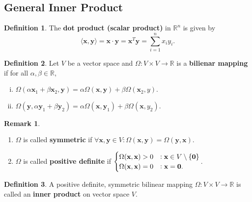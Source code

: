 \documentclass[12pt,openany]{book}
\theoremstyle{definition}
\newtheorem{definition}{Definition}[chapter]
\newtheorem{remark}{Remark}[chapter]
\newcommand{\R}{\mathbb{R}}
\begin{document}
	\subsection{General Inner Product}
	\begin{tcolorbox}[colframe=defcolor,title={\color{white}\bf Dot Product (Scalar Product)}]
		\begin{definition}
			The \textbf{dot product (scalar product)} in \(\R^n\) is given by \[
			\langle\textbf{x},\textbf{y}\rangle=\textbf{x}\cdot\textbf{y}=\textbf{x}^T\textbf{y}=\sum_{i=1}^nx_iy_i.
			\]
		\end{definition}
	\end{tcolorbox}
	\vspace{8pt}
	\begin{tcolorbox}[colframe=defcolor,title={\color{white}\bf Bilinaer Mapping}]
		\begin{definition}
			Let \(V\) be a vector space and \(\Omega:V\times V\to\R\) is a \textbf{bilienar mapping} if for all \(\alpha,\beta\in\R\),  \begin{enumerate}[(i)]
				\item $\Omega(\alpha \textbf{x}_1+\beta\textbf{x}_2,\textbf{y}) = \alpha\Omega(\textbf{x},\textbf{y})+\beta\Omega(\textbf{x}_2,y)$.
				\item $\Omega(\textbf{y},\alpha\textbf{y}_1+\beta\textbf{y}_2) = \alpha\Omega(\textbf{x},\textbf{y}_1)+\beta\Omega(\textbf{x},y_2)$.
			\end{enumerate}
		\end{definition}
	\end{tcolorbox}
	\begin{remark}
		\ \begin{enumerate}[(1)]
			\item \(\Omega\) is called \textbf{symmetric} if \(\forall\textbf{x},\textbf{y}\in V:\Omega(\textbf{x},\textbf{y})=\Omega(\textbf{y},\textbf{x})\).
			\item \(\Omega\) is called \textbf{positive definite} if $
			\begin{cases}
				\Omega(\textbf{x},\textbf{x})>0 &:\textbf{x}\in V\setminus\set{\textbf{0}}\\
				\Omega(\textbf{x},\textbf{x})=0 &:\textbf{x}=\textbf{0}.
			\end{cases}$.
		\end{enumerate}
	\end{remark}
	\vspace{8pt}
	\begin{tcolorbox}[colframe=defcolor,title={\color{white}\bf Inner Product}]
		\begin{definition}
			A positive definite, symmetric bilinear mapping \(\Omega:V\times V\to\R\) is called an \textbf{inner product} on vector space \(V\). 
		\end{definition}
	\end{tcolorbox}
\end{document}
